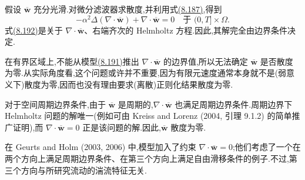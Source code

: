 \begin{note}[滤波速度的散度]
\label{note:leray-alpha-filtered-velocity-divergence}
假设 $\overline{\bm{w}}$ 充分光滑.对微分滤波器求散度,并利用式\hyperref[eq:les-adm-divergence-filter-commutation]{(8.187)},得到
\begin{equation}\label{eq:leray-alpha-filtered-divergence-equation}
 -\alpha^2\Delta(\nabla\cdot\overline{\bm{w}})
 +\nabla\cdot\overline{\bm{w}}=0
 \quad\text{于 }(0,T]\times\Omega.
\end{equation}
式\hyperref[eq:leray-alpha-filtered-divergence-equation]{(8.192)}是关于 $\nabla\cdot\overline{\bm{w}}$、右端齐次的 Helmholtz 方程.因此,其解完全由边界条件决定.

在有界区域上,不能从模型\hyperref[eq:leray-alpha-model]{(8.191)}推出 $\nabla\cdot\overline{\bm{w}}$ 的边界值,所以无法确定 $\overline{\bm{w}}$ 是否散度为零.从实际角度看,这个问题或许并不重要,因为有限元速度通常本身就不是(弱意义下)散度为零,因而也没有理由要求(离散)正则化结果散度为零.

对于空间周期边界条件,由于 $\overline{\bm{w}}$ 是周期的,$\nabla\cdot\overline{\bm{w}}$ 也满足周期边界条件.周期边界下 Helmholtz 问题的解唯一(例如可由 Kreiss and Lorenz (2004, 引理 9.1.2) 的简单推广证明),而 $\nabla\cdot\overline{\bm{w}}=0$ 正是该问题的解.因此,$\overline{\bm{w}}$ 散度为零.

在 Geurts and Holm (2003, 2006) 中,模型加入了约束 $\nabla\cdot\overline{\bm{w}}=0$;他们考虑了一个在两个方向上满足周期边界条件、在第三个方向上满足自由滑移条件的例子.不过,第三个方向与所研究流动的湍流特征无关.
\end{note}

